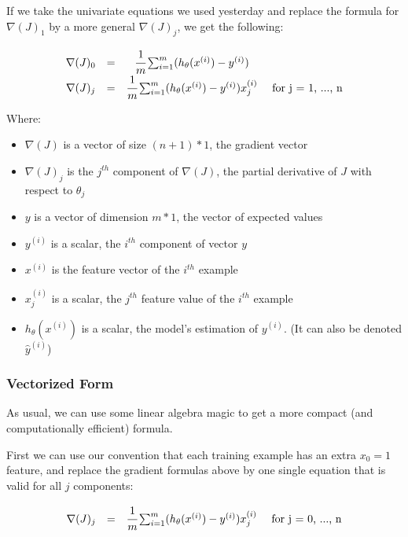 \documentclass[]{article}
\begin{document}
If we take the univariate equations we used yesterday and replace the
formula for \(\nabla(J)_1\) by a more general \(\nabla(J)_j\), we get
the following:

\large

\[
\begin{matrix}
\nabla(J)_0 &  = &\cfrac{1}{m}\sum_{i=1}^{m}(h_{\theta}(x^{(i)}) - y^{(i)}) & \\
\nabla(J)_j & = &\cfrac{1}{m}\sum_{i=1}^{m}(h_{\theta}(x^{(i)}) - y^{(i)})x_{j}^{(i)} & \text{ for j = 1, ..., n}    
\end{matrix}
\] \normalsize

Where:

\begin{itemize}
\item
  \(\nabla(J)\) is a vector of size \((n + 1) * 1\), the gradient vector
\item
  \(\nabla(J)_j\) is the \(j^{th}\) component of \(\nabla(J)\), the
  partial derivative of \(J\) with respect to \(\theta_j\)
\item
  \(y\) is a vector of dimension \(m * 1\), the vector of expected
  values
\item
  \(y^{(i)}\) is a scalar, the \(i^{th}\) component of vector \(y\)
\item
  \(x^{(i)}\) is the feature vector of the \(i^{th}\) example
\item
  \(x^{(i)}_j\) is a scalar, the \(j^{th}\) feature value of the
  \(i^{th}\) example
\item
  \(h_{\theta}(x^{(i)})\) is a scalar, the model's estimation of
  \(y^{(i)}\). (It can also be denoted \(\hat{y}^{(i)}\))
\end{itemize}

\hypertarget{vectorized-form}{%
\subsubsection{Vectorized Form}\label{vectorized-form}}

As usual, we can use some linear algebra magic to get a more compact
(and computationally efficient) formula.

First we can use our convention that each training example has an extra
\(x_0 = 1\) feature, and replace the gradient formulas above by one
single equation that is valid for all \(j\) components:

\large

\[
\begin{matrix}
\nabla(J)_j & = &\cfrac{1}{m}\sum_{i=1}^{m}(h_{\theta}(x^{(i)}) - y^{(i)})x_{j}^{(i)} & \text{ for j = 0, ..., n}
\end{matrix}
\] \normalsize
\end{document}
